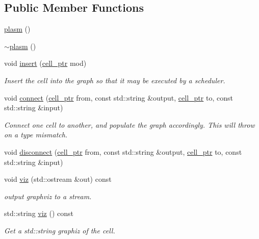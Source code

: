 \subsection*{Public Member Functions}
\begin{DoxyCompactItemize}
\item 
\hyperlink{structecto_1_1plasm_a1d4a2f7e4fa1a4ef839c7ba0316a825c}{plasm} ()
\item 
\hyperlink{structecto_1_1plasm_a3000d2cb042c0875b4d5c38d33763845}{$\sim$plasm} ()
\item 
void \hyperlink{structecto_1_1plasm_a3419c720b1f839cf9b423655cf4de343}{insert} (\hyperlink{namespaceecto_aed1809e82b9229ea81ef9ee3438cf62c}{cell\-\_\-ptr} mod)
\begin{DoxyCompactList}\small\item\em Insert the cell into the graph so that it may be executed by a scheduler. \end{DoxyCompactList}\item 
void \hyperlink{structecto_1_1plasm_a0ca320f5cef8372cfa713fd7991ad3b2}{connect} (\hyperlink{namespaceecto_aed1809e82b9229ea81ef9ee3438cf62c}{cell\-\_\-ptr} from, const std\-::string \&output, \hyperlink{namespaceecto_aed1809e82b9229ea81ef9ee3438cf62c}{cell\-\_\-ptr} to, const std\-::string \&input)
\begin{DoxyCompactList}\small\item\em Connect one cell to another, and populate the graph accordingly. This will throw on a type mismatch. \end{DoxyCompactList}\item 
void \hyperlink{structecto_1_1plasm_a5e187b40ce0a7d7ed9a6859452aed5ca}{disconnect} (\hyperlink{namespaceecto_aed1809e82b9229ea81ef9ee3438cf62c}{cell\-\_\-ptr} from, const std\-::string \&output, \hyperlink{namespaceecto_aed1809e82b9229ea81ef9ee3438cf62c}{cell\-\_\-ptr} to, const std\-::string \&input)
\item 
void \hyperlink{structecto_1_1plasm_a6350e90b6d85a218e7a84183eaed0c18}{viz} (std\-::ostream \&out) const 
\begin{DoxyCompactList}\small\item\em output graphviz to a stream. \end{DoxyCompactList}\item 
std\-::string \hyperlink{structecto_1_1plasm_a4586d90c908123a18dbd3a26c206f63c}{viz} () const 
\begin{DoxyCompactList}\small\item\em Get a std\-::string graphiz of the cell. \end{DoxyCompactList}\item 

\end{DoxyCompactItemize}
